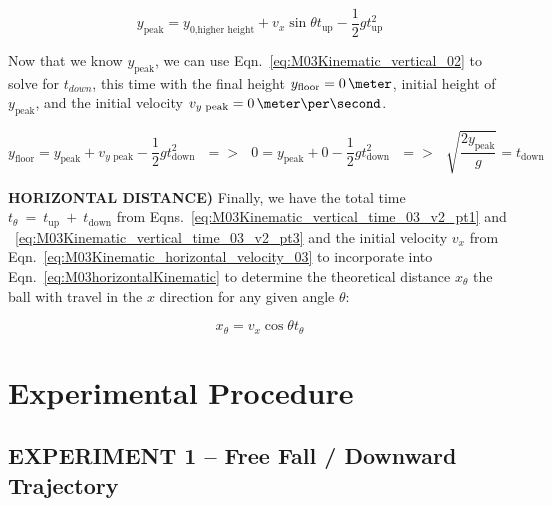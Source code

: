  \begin{equation}
  \label{eq:M03Kinematic_vertical_time_03_v2_pt2}
  y_{\text{peak}} = y_{0\text{,higher height}} + v_{x}\sin{\theta}t_{\text{up}} - \frac{1}{2}gt_{\text{up}}^{2}
\end{equation}


Now that we know $y_{\text{peak}}$, we can use Eqn.~\ref{eq:M03Kinematic_vertical_02} to solve for $t_{down}$, this time with the final height $y_{\text{floor}} = 0\,\meter$, initial height of $y_{\text{peak}}$, and the initial velocity $v_{y\text{ peak}} = 0\,\meter\per\second$.


 \begin{equation}
  \label{eq:M03Kinematic_vertical_time_03_v2_pt3}
  y_{\text{floor}} = y_{\text{peak}} + v_{y\text{ peak}} - \frac{1}{2}gt_{\text{down}}^{2}~~~=>~~~0 = y_{\text{peak}} + 0 - \frac{1}{2}gt_{\text{down}}^{2}~~~=>~~~\sqrt{\frac{2y_{\text{peak}}}{g}} = t_{\text{down}}
\end{equation}


\textbf{HORIZONTAL DISTANCE)} Finally, we have the total time $t_{\theta}~=~t_{\text{up}}~+~t_{\text{down}}$ from Eqns.~\ref{eq:M03Kinematic_vertical_time_03_v2_pt1} and ~\ref{eq:M03Kinematic_vertical_time_03_v2_pt3} and the initial velocity $v_{x}$ from Eqn.~\ref{eq:M03Kinematic_horizontal_velocity_03} to incorporate into Eqn.~\ref{eq:M03horizontalKinematic} to determine the theoretical distance $x_{\theta}$ the ball with travel in the $x$ direction for any given angle $\theta$:

 \begin{equation}
  \label{eq:M03Kinematic_vertical_time_03_v2_pt4}
  x_{\theta} = v_{x}\cos{\theta}t_{\theta}
\end{equation}



\section{Experimental Procedure}


\subsection{EXPERIMENT 1 -- Free Fall / Downward Trajectory}




